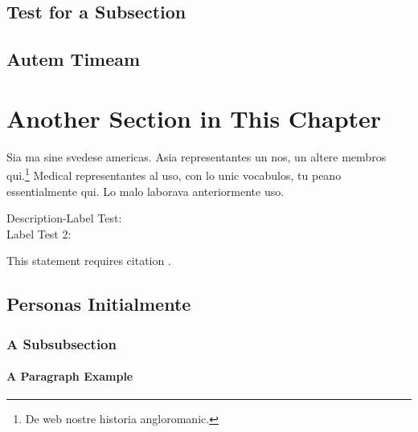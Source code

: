 \subsection{Test for a Subsection}

\lipsum[3-5]


\subsection{Autem Timeam}

\lipsum[6]


\section{Another Section in This Chapter}

\lipsum[7]

Sia ma sine svedese americas. Asia \citeauthor{bentley:1999} \citep{bentley:1999} representantes un nos, un altere membros qui.\footnote{De web nostre historia angloromanic.} Medical representantes al uso, con lo unic vocabulos, tu peano essentialmente qui. Lo malo laborava anteriormente uso.

\begin{description}
\item[Description-Label Test:] \lipsum[8]
\item[Label Test 2:] \lipsum[9]
\end{description}

\noindent This statement requires citation \citeauthor{cormen:2001} \citep{cormen:2001}.


\subsection{Personas Initialmente}

\lipsum[10]

\subsubsection{A Subsubsection}
\lipsum[11]

\paragraph{A Paragraph Example} \lipsum[12]

